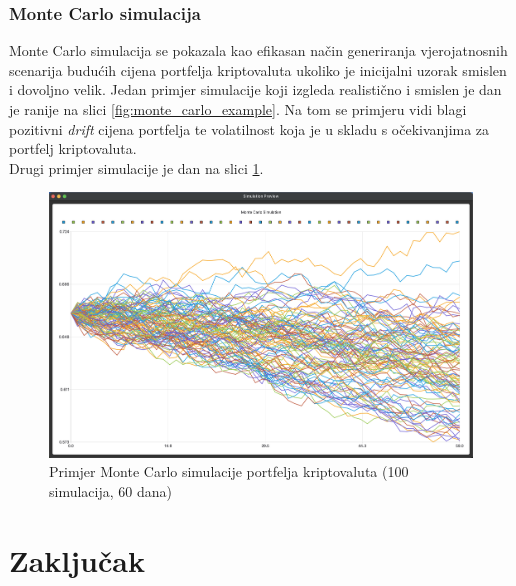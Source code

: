 \documentclass[zavrsnirad]{fer}
\begin{document}
\subsection{Monte Carlo simulacija}
\label{sek:monte_carlo_rezultati}
Monte Carlo simulacija se pokazala kao efikasan način
generiranja vjerojatnosnih scenarija budućih cijena portfelja kriptovaluta
ukoliko je inicijalni uzorak smislen i dovoljno velik.
Jedan primjer simulacije koji izgleda realistično i smislen je
dan je ranije na slici \ref{fig:monte_carlo_example}.
Na tom se primjeru vidi blagi pozitivni \textit{drift} cijena portfelja
te volatilnost koja je u skladu s očekivanjima za portfelj kriptovaluta.
\\
Drugi primjer simulacije je dan na slici \ref{fig:monte_carlo_example2}.
\begin{figure}[H]
    \centering
    \includegraphics[width=1.0\textwidth]{Figures/monte_carlo_example2.png}
    \caption{Primjer Monte Carlo simulacije portfelja kriptovaluta (100
    simulacija, 60 dana)}
    \label{fig:monte_carlo_example2}
\end{figure}










\chapter{Zaključak}
\label{pog:zakljucak}

\blindtext

\end{document}
